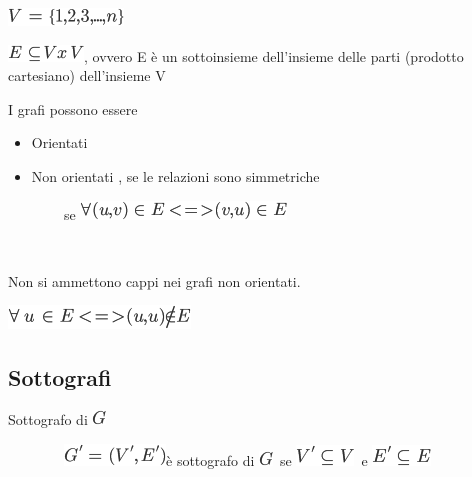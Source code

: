 \documentclass{article}
\providecommand{\tightlist}{%
  \setlength{\itemsep}{0pt}\setlength{\parskip}{0pt}}
\begin{document}
\includegraphics{images/image336.png}

\includegraphics{images/image337.png}{, ovvero E è un sottoinsieme
dell'insieme delle parti (prodotto cartesiano) dell'insieme V}

{}

{I grafi possono essere}

\begin{itemize}
\tightlist
\item
  {Orientati}
\item
  {Non orientati , se le relazioni sono simmetriche}
\end{itemize}

{~~~~~~~~se }\includegraphics{images/image338.png}

{~~~~~~~~}

{Non si ammettono cappi nei grafi non orientati.}

\includegraphics{images/image339.png}

{}

\hypertarget{h.5gj1hs8i1ooy}{\subsection{\texorpdfstring{{Sottografi}}{Sottografi}}\label{h.5gj1hs8i1ooy}}

{Sottografo di }\includegraphics{images/image340.png}

{~~~~~~~~}\includegraphics{images/image341.png}{è sottografo di
}\includegraphics{images/image340.png}{~se
}\includegraphics{images/image342.png}{~e
}\includegraphics{images/image343.png}
\end{document}

